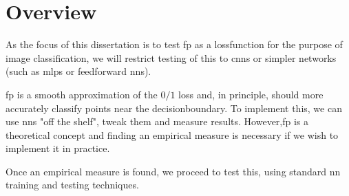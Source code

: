 \section{Overview}

As the focus of this dissertation is to test \gls{fp} as a \gls{lossfunction} for the purpose of image classification, we will restrict testing of this to \gls{cnn}s or simpler networks (such as  \gls{mlp}s or \gls{feedforward} \gls{nn}s).

 \gls{fp} is a smooth approximation of the $0/1$ loss and, in principle, should more accurately classify points near the \gls{decisionboundary}. To implement this, we can use  \gls{nn}s "off the shelf", tweak them and measure results. However,\gls{fp} is a theoretical concept and finding an empirical measure is necessary if we wish to implement it in practice. 

Once an empirical measure is found, we proceed to test this, using standard \gls{nn} training and testing techniques.

